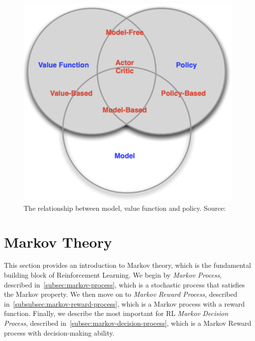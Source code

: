 \documentclass[../xlapes02]{subfiles}
\begin{document}

    \begin{figure}[h]
        \includegraphics[width=0.5\linewidth]{image/model-value-policy}
        \centering
        \caption{The relationship between model, value function and policy. Source:~\cite{FITMT25127}}
        \label{fig:model-value-policy-introduction}
    \end{figure}


    \section{Markov Theory}\label{sec:markov-models-for-rl}
    This section provides an introduction to Markov theory, which is the fundamental building block of Reinforcement Learning. We begin by \emph{Markov Process}, described in~\cref{subsec:markov-process}, which is a stochastic process that satisfies the Markov property. We then move on to \emph{Markov Reward Process}, described in~\cref{subsubsec:markov-reward-process}, which is a Markov process with a reward function. Finally, we describe the most important for RL \emph{Markov Decision Process}, described in~\cref{subsec:markov-decision-process}, which is a Markov Reward process with decision-making ability.
\end{document}
